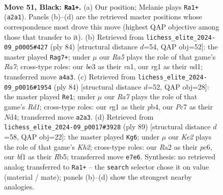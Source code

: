 \documentclass[11pt]{article}
\begin{document}
\clearpage

\begin{figure}[p]\centering
\begin{subfigure}{0.46\textwidth}\centering
\resizebox{\linewidth}{!}{%
\newchessgame
\chessboard[
  setfen={4n3/p1p1k3/8/5p2/r4P1R/4B3/r6P/1K3BR1 b - - 7 51},
  showmover=false,
  pgfstyle=straightmove, color=movearrow, markmove={a2-a1}
]}
\caption{}
\end{subfigure}\hfill
\begin{subfigure}{0.46\textwidth}\centering
\resizebox{\linewidth}{!}{%
\newchessgame
\chessboard[
  setfen={6k1/R6R/5r1p/4N3/8/p3P1KP/6P1/r2n4 w - - 3 43},
  showmover=false,
  pgfstyle=straightmove, color=movearrow, markmove={a7-g7}
]}
\caption{}
\end{subfigure}
\\[4pt]
\begin{subfigure}{0.46\textwidth}\centering
\resizebox{\linewidth}{!}{%
\newchessgame
\chessboard[
  setfen={8/1b3k2/r2p1n2/p5r1/1pPN4/1P5K/8/R2R4 w - - 0 43},
  showmover=false,
  pgfstyle=straightmove, color=movearrow, markmove={d1-e1}
]}
\caption{}
\end{subfigure}\hfill
\begin{subfigure}{0.46\textwidth}\centering
\resizebox{\linewidth}{!}{%
\newchessgame
\chessboard[
  setfen={b5r1/2R3pk/2P5/1r6/4p1P1/8/1B1R1P1K/8 b - - 0 45},
  showmover=false,
  pgfstyle=straightmove, color=movearrow, markmove={h7-g6}
]}
\caption{}
\end{subfigure}
\caption{\textbf{Move 51, Black: \texttt{Ra1+}.} (a) Our position; Melanie plays \texttt{Ra1+} (\texttt{a2a1}). Panels (b)--(d) are the retrieved master positions whose correspondence most drove this move (highest QAP objective among those that transfer to it). (b) Retrieved from \texttt{lichess\_elite\_2024-09\_p0005\#427} (ply 84) [structural distance $d$=54, QAP obj=52]: the master played \texttt{Rag7+}; under $\mu$ our \emph{Ra5} plays the role of that game's \emph{Ra7}; cross-type roles: our \emph{b}e3 as their \emph{r}a1, our \emph{r}g1 as their \emph{n}d1; transferred move \texttt{a4a3}. (c) Retrieved from \texttt{lichess\_elite\_2024-09\_p0016\#1954} (ply 84) [structural distance $d$=52, QAP obj=28]: the master played \texttt{Re1}; under $\mu$ our \emph{Ra7} plays the role of that game's \emph{Rd1}; cross-type roles: our \emph{r}g1 as their \emph{p}b4, our \emph{P}c7 as their \emph{N}d4; transferred move \texttt{a2a3}. (d) Retrieved from \texttt{lichess\_elite\_2024-09\_p0017\#3928} (ply 89) [structural distance $d$=58, QAP obj=22]: the master played \texttt{Kg6}; under $\mu$ our \emph{Ke2} plays the role of that game's \emph{Kh2}; cross-type roles: our \emph{R}a2 as their \emph{p}c6, our \emph{b}f1 as their \emph{R}b5; transferred move \texttt{e7e6}. Synthesis: no retrieved analog transferred to \texttt{Ra1+} -- the \texttt{search} selector chose it on value (material / mate); panels (b)--(d) show the strongest nearby analogies.}
\label{fig:thought-m101}
\end{figure}
\end{document}
